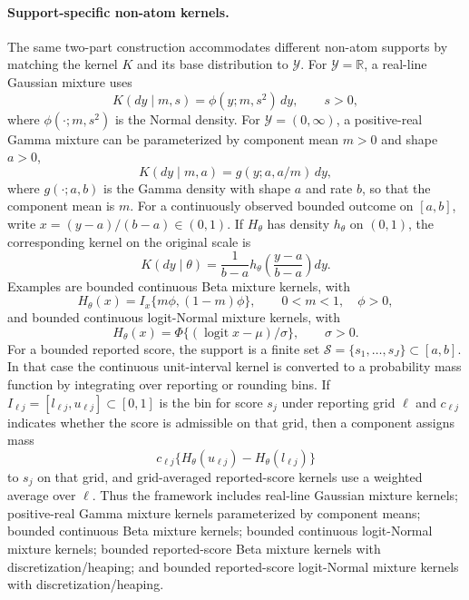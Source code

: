 \documentclass[11pt]{article}
\DeclareMathOperator*{\logit}{logit}
\begin{document}
\paragraph{Support-specific non-atom kernels.}
The same two-part construction accommodates different non-atom supports by matching the kernel $K$ and its base distribution to $\mathcal{Y}$. For $\mathcal{Y}=\mathbb{R}$, a real-line Gaussian mixture uses
\[
  K(dy\mid m,s)=\phi(y;m,s^2)\,dy,
  \qquad s>0,
\]
where $\phi(\cdot;m,s^2)$ is the Normal density. For $\mathcal{Y}=(0,\infty)$, a positive-real Gamma mixture can be parameterized by component mean $m>0$ and shape $a>0$,
\[
  K(dy\mid m,a)=g(y;a,a/m)\,dy,
\]
where $g(\cdot;a,b)$ is the Gamma density with shape $a$ and rate $b$, so that the component mean is $m$. For a continuously observed bounded outcome on $[a,b]$, write $x=(y-a)/(b-a)\in(0,1)$. If $H_\theta$ has density $h_\theta$ on $(0,1)$, the corresponding kernel on the original scale is
\[
  K(dy\mid\theta)
  =
  \frac{1}{b-a}h_\theta\!\left(\frac{y-a}{b-a}\right)dy.
\]
Examples are bounded continuous Beta mixture kernels, with
\[
  H_\theta(x)=I_x\{m\phi,(1-m)\phi\},
  \qquad 0<m<1,
  \quad \phi>0,
\]
and bounded continuous logit-Normal mixture kernels, with
\[
  H_\theta(x)=\Phi\{(\logit x-\mu)/\sigma\},
  \qquad \sigma>0.
\]
For a bounded reported score, the support is a finite set $\mathcal{S}=\{s_1,\ldots,s_J\}\subset[a,b]$. In that case the continuous unit-interval kernel is converted to a probability mass function by integrating over reporting or rounding bins. If $I_{\ell j}=[l_{\ell j},u_{\ell j}]\subset[0,1]$ is the bin for score $s_j$ under reporting grid $\ell$ and $c_{\ell j}$ indicates whether the score is admissible on that grid, then a component assigns mass
\[
  c_{\ell j}\{H_\theta(u_{\ell j})-H_\theta(l_{\ell j})\}
\]
to $s_j$ on that grid, and grid-averaged reported-score kernels use a weighted average over $\ell$. Thus the framework includes real-line Gaussian mixture kernels; positive-real Gamma mixture kernels parameterized by component means; bounded continuous Beta mixture kernels; bounded continuous logit-Normal mixture kernels; bounded reported-score Beta mixture kernels with discretization/heaping; and bounded reported-score logit-Normal mixture kernels with discretization/heaping.
\end{document}
